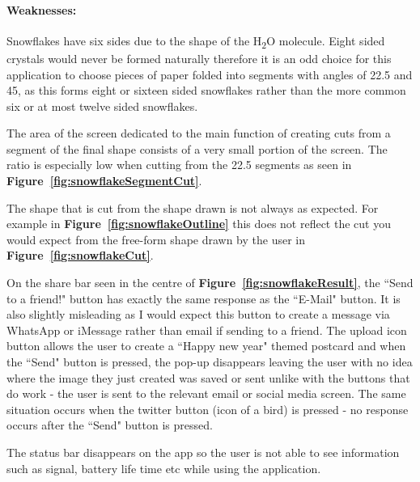 \documentclass[11pt]{article}
\begin{document}
                \paragraph{Weaknesses:}
                Snowflakes have six sides due to the shape of the H\textsubscript{2}O molecule. Eight sided crystals would never be formed naturally therefore it is an odd choice for this application to choose pieces of paper folded into segments with angles of 22.5\textdegree{} and 45\textdegree{}, as this forms eight or sixteen sided snowflakes rather than the more common six or at most twelve sided snowflakes. %
                
                The area of the screen dedicated to the main function of creating cuts from a segment of the final shape consists of a very small portion of the screen. The ratio is especially low when cutting from the 22.5\textdegree{} segments as seen in \textbf{Figure~\ref{fig:snowflakeSegmentCut}}.
                
                The shape that is cut from the shape drawn is not always as expected. For example in \textbf{Figure~\ref{fig:snowflakeOutline}} this does not reflect the cut you would expect from the free-form shape drawn by the user in \textbf{Figure~\ref{fig:snowflakeCut}}.
               
                On the share bar seen in the centre of \textbf{Figure~\ref{fig:snowflakeResult}}, the ``Send to a friend!" button has exactly the same response as the ``E-Mail" button. It is also slightly  misleading as I would expect this button to create a message via WhatsApp or iMessage rather than email if sending to a friend. The upload icon button allows the user to create a ``Happy new year" themed postcard and when the ``Send" button is pressed, the pop-up disappears leaving the user with no idea where the image they just created was saved or sent unlike with the buttons that do work - the user is sent to the relevant email or social media screen. The same situation occurs when the twitter button (icon of a bird) is pressed - no response occurs after the ``Send" button is pressed.
                
                The status bar disappears on the app so the user is not able to see information such as signal, battery life time etc while using the application. 
                 
\end{document}
